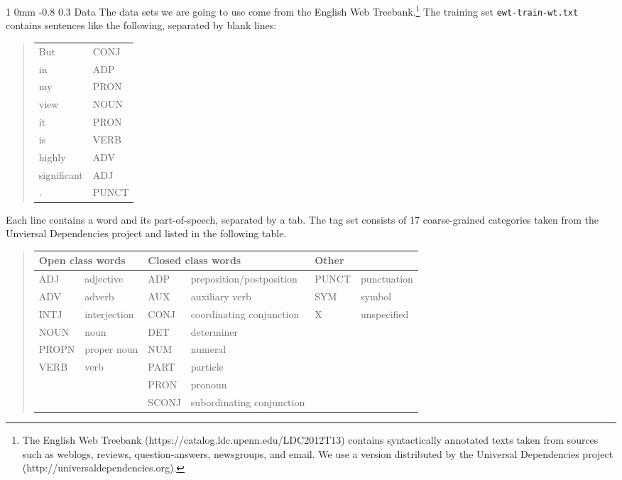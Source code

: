 \documentclass[11pt]{article}
\makeatletter
\newcommand{\newsec}[2]{\section{#1}\label{sec:#2}\noindent}
\renewcommand{\section}{\@startsection
{section}%
{1}%
{0mm}%
{-0.8\baselineskip}%
{0.3\baselineskip}%
{\bfseries\large}}%
\makeatother
\begin{document}
\newsec{Data}{data}%
The data sets we are going to use come from the English Web
Treebank.\footnote{The English Web Treebank
  (https://catalog.ldc.upenn.edu/LDC2012T13) contains syntactically
  annotated texts taken from sources such as weblogs, reviews,
  question-answers, newsgroups, and email.  We use a version
  distributed by the Universal Dependencies project
  (http://universaldependencies.org).} The training set
{\tt ewt-train-wt.txt} contains sentences like the following,
separated by blank lines:
\begin{quote}
\begin{tt}
\begin{tabular}{ll}
But          &CONJ\\
in            &ADP\\
my            &PRON\\
view          &NOUN\\
it            &PRON\\
is            &VERB\\
highly        &ADV\\
significant   &ADJ\\
.             &PUNCT\\
\end{tabular}
\end{tt}
\end{quote}
Each line contains a word and its part-of-speech, separated by a
tab. The tag set consists of 17 coarse-grained categories taken from
the Unviersal Dependencies project and listed in the following table.
	\begin{quote}
	\renewcommand{\tabcolsep}{4pt}
	\begin{tabular}{|ll|ll|ll|}
	\hline
	\multicolumn{2}{|l|}{{\bf Open class words}} & \multicolumn{2}{l|}{{\bf Closed class words}} & \multicolumn{2}{l|}{{\bf Other}} \\
	\hline
	ADJ & adjective & ADP & preposition/postposition & PUNCT & punctuation\\
	ADV & adverb & AUX & auxiliary verb & SYM & symbol \\
	INTJ & interjection & CONJ & coordinating conjunction & X & unspecified \\
	NOUN & noun & DET & determiner & & \\
	PROPN & proper noun & NUM & numeral & & \\
	VERB & verb & PART & particle  & & \\
	 & & PRON & pronoun & & \\
	 & & SCONJ & subordinating conjunction & & \\
	\hline
	\end{tabular}
	\end{quote}
\end{document}
